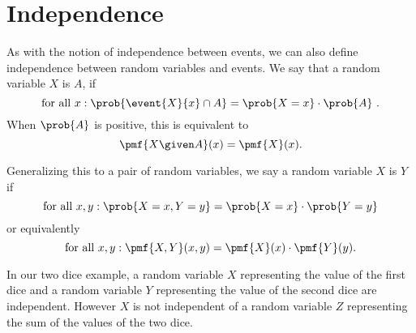 \section{Independence}
\label{sec:probability::randvar::independence}

\begin{cluster}
\label{grp:grm:probability::randvar::notion}

\begin{gram}
\label{grm:probability::randvar::notion}
As with the notion of independence between events, we can also define
independence between random variables and events.
We say that a random variable $X$ is 
$A$, if 
\[
\mbox{for all}~x: \prob{\event{X}{x} \cap A} = \prob{X = x} \cdot \prob{A}~.
\] 
When $\prob{A}$ is positive, this is equivalent to 
\[
\pmf{X \given A} (x) = \pmf{X}(x).
\]

Generalizing this to a pair of random variables, we say a random variable
$X$ is  $Y$ if 
\[
\mbox{for all}~x, y: \prob{X = x, Y = y} = \prob{X = x} \cdot \prob{Y = y}
\]
or equivalently
\[
\mbox{for all}~x, y: \pmf{X,Y}(x,y) = \pmf{X}(x) \cdot \pmf{Y}(y).
\]

In our two dice
example, a random variable $X$ representing the value of the first
dice and a random variable $Y$ representing the value of the second
dice are independent. 
However $X$ is not independent of a random variable $Z$ representing
the sum of the values of the two dice.

\end{gram}
\end{cluster}

